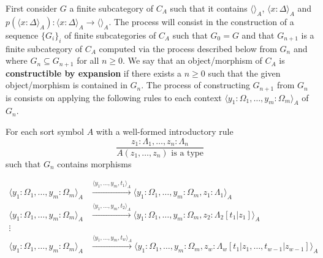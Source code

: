 First consider $G$ a finite subcategory of $C_A$ such that 
it contains $\langle \rangle_A$, $\langle x: \Delta \rangle_A$
and $p(\langle x : \Delta \rangle_A) : \langle x : \Delta \rangle_A \to \langle \rangle_A$.
The process will consist in the construction of a sequence $\{ G_i \}_i$
of finite subcategories of $C_A$ such that $G_0 = G$ and that 
$G_{n+1}$ is a finite subcategory of $C_A$ 
computed via the process described below from $G_n$
and where $G_n \subseteq G_{n+1}$ for all $n \geq 0$.
We say that an object/morphism of $C_A$ is \textbf{constructible by expansion}
if there exists a $n \geq 0$ such that
the given object/morphism is contained in $G_n$.
The process of constructing $G_{n+1}$ from $G_n$ is consists on 
applying the following rules to each context 
$\langle y_1 : \Omega_1, \dots, y_m : \Omega_m \rangle_A$
of $G_n$.
\begin{itemize}
     For each sort symbol $A$ with a well-formed
              introductory rule \[
              \dfrac{
                z_1 : \Lambda_1, \dots, z_n : \Lambda_n
              }{
                A(z_1, \dots, z_n) \text{ is a type}
              }
              \]
              such that $G_n$ contains morphisms

              \begin{align*} %
                \langle y_1 : \Omega_1, \dots, y_m : \Omega_m \rangle_A 
                &\xrightarrow{\langle y_1, \dots, y_m, t_1 \rangle_A}
                \langle y_1 : \Omega_1, \dots, y_m : \Omega_m, z_1 : \Lambda_1 \rangle_A \\
                \langle y_1 : \Omega_1, \dots, y_m : \Omega_m \rangle_A
                &\xrightarrow{\langle y_1, \dots, y_m, t_2 \rangle_A}
                \langle y_1 : \Omega_1, \dots, y_m : \Omega_m, z_2 : \Lambda_2[t_1 | z_1] \rangle_A \\
                \vdots \\
                \langle y_1 : \Omega_1, \dots, y_m : \Omega_m \rangle_A
                &\xrightarrow{\langle y_1, \dots, y_m, t_w \rangle_A}
                \langle y_1 : \Omega_1, \dots, y_m : \Omega_m, z_w : \Lambda_w[t_1 | z_1, \dots, t_{w-1} | z_{w-1}] \rangle_A \\
              \end{align*}


\end{itemize}
